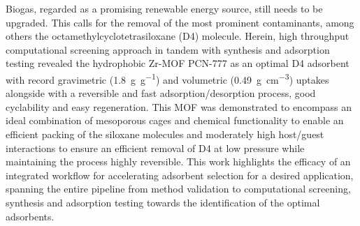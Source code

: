 
Biogas, regarded as a promising renewable energy source, still needs to be
upgraded. This calls for the removal of the most prominent contaminants, among
others the octamethylcyclotetrasiloxane (D4) molecule. Herein, high throughput
computational screening approach in tandem with synthesis and adsorption testing
revealed the hydrophobic Zr-MOF PCN-777 as an optimal D4 adsorbent with record
gravimetric (\SI{1.8}{\gram\per\gram}) and volumetric
(\SI{0.49}{\gram\per\centi\metre\cubed}) uptakes alongside with a reversible and
fast adsorption/desorption process, good cyclability and easy regeneration. This
MOF was demonstrated to encompass an ideal combination of mesoporous cages and
chemical functionality to enable an efficient packing of the siloxane molecules
and moderately high host/guest interactions to ensure an efficient removal of D4
at low pressure while maintaining the process highly reversible. This work
highlights the efficacy of an integrated workflow for accelerating adsorbent
selection for a desired application, spanning the entire pipeline from method
validation to computational screening, synthesis and adsorption testing towards
the identification of the optimal adsorbents.